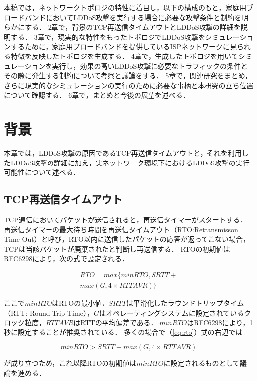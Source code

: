 \documentclass[Japanese]{dicomopapers}
\begin{document}
本稿では，ネットワークトポロジの特性に着目し，以下の構成のもと，家庭用ブロードバンドにおいてLDDoS攻撃を実行する場合に必要な攻撃条件と制約を明らかにする．
2章で，背景のTCP再送信タイムアウトとLDDoS攻撃の詳細を説明する．
3章で，現実的な特性をもったトポロジでLDDoS攻撃をシミュレーションするために，家庭用ブロードバンドを提供しているISPネットワークに見られる特徴を反映したトポロジを生成する．
4章で，生成したトポロジを用いてシミュレーションを実行し，効果の高いLDDoS攻撃に必要なトラフィックの条件とその際に発生する制約について考察と議論をする．
5章で，関連研究をまとめ，さらに現実的なシミュレーションの実行のために必要な事柄と本研究の立ち位置について確認する．
6章で，まとめと今後の展望を述べる．

\section{背景}
本章では，LDDoS攻撃の原因であるTCP再送信タイムアウトと，それを利用したLDDoS攻撃の詳細に加え，実ネットワーク環境下におけるLDDoS攻撃の実行可能性について述べる．

\subsection{TCP再送信タイムアウト}

TCP通信においてパケットが送信されると，再送信タイマーがスタートする．
再送信タイマーの最大待ち時間を再送信タイムアウト（RTO:Retransmisson Time Out）と呼び，RTO以内に送信したパケットの応答が返ってこない場合，TCPは当該パケットが廃棄されたと判断し再送信する．
RTOの初期値はRFC6298\cite{rfc}により，次の式で設定される．

\begin{eqnarray}
    \label{eq:rto}
    RTO = max\{minRTO,SRTT+ \nonumber \\ max(G,4×RTTAVR)\}
\end{eqnarray}

ここで$minRTO$はRTOの最小値，$SRTT$は平滑化したラウンドトリップタイム（RTT: Round Trip Time），$G$はオペレーティングシステムに設定されているクロック粒度，$RTTAVR$はRTTの平均偏差である．
$minRTO$はRFC6298\cite{rfc}により，1秒に設定することが推奨されている．
多くの場合で（\ref{eq:rto}）式の右辺では

\begin{equation}
    minRTO > SRTT + max(G,4×RTTAVR)
\end{equation}

が成り立つため，これ以降RTOの初期値は$minRTO$に設定されるものとして議論を進める．
\end{document}

